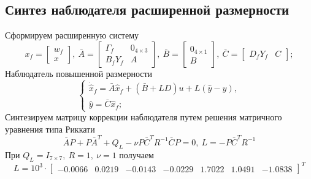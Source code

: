 \documentclass[a4paper, 12pt]{article}
\begin{document}
    \subsection{Синтез наблюдателя расширенной размерности}
    Сформируем расширенную систему
    $$
    x_f=\begin{bmatrix}
        w_f\\
        x
    \end{bmatrix},\ \bar{A}=\begin{bmatrix}
        \Gamma_f &0_{4\times3}\\
        B_fY_f &A
    \end{bmatrix},\ \bar{B}=\begin{bmatrix}
        0_{4\times1}\\B
    \end{bmatrix},\ \bar{C}=\begin{bmatrix}
        D_fY_f &C
    \end{bmatrix};
    $$
    Наблюдатель повышенной размерности
    $$
    \begin{cases}
        \dot{\hat{x}}_f=\bar{A}\hat{x}_f+\left( \bar{B}+LD \right)u+L\left( \hat{y}-y \right),\\
        \hat{y}=\bar{C}\hat{x}_f;
    \end{cases}
    $$
    Синтезируем матрицу коррекции наблюдателя путем решения матричного уравнения
    типа Риккати
    $$
    \bar{A}P+P\bar{A}^T+Q_{L}-\nu P\bar{C}^TR^{-1}\bar{C}P=0,\ L=-P\bar{C}^TR^{-1}
    $$
    При $Q_{L}=I_{7\times7},\ R=1,\ \nu=1$ получаем
    $$
    L=10^3\cdot\begin{bmatrix}
    -0.0066&
    0.0219&
   -0.0143&
   -0.0229&
    1.7022&
    1.0491&
   -1.0838
    \end{bmatrix}^T
    $$

    
\end{document}
